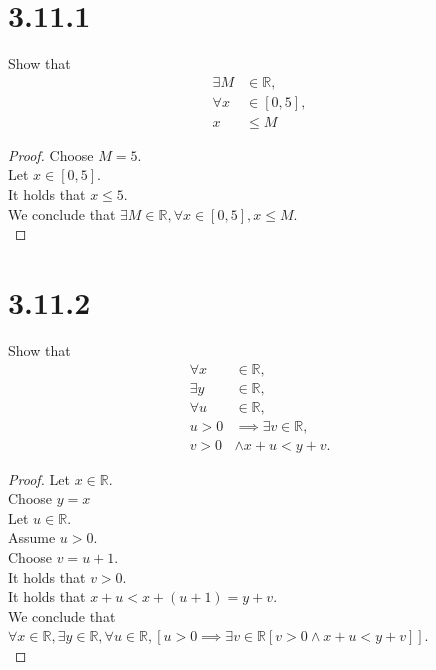 \documentclass{article}
\theoremstyle{mytheoremstyle}
\theoremstyle{mytheoremstyle}
\theoremstyle{myproblemstyle}
\begin{document}
    \newpage

    \section{3.11.1}
    \begin{problem}
        Show that 
        \begin{align*}
            \exists M &\in \mathbb{R}, \\
            \forall x &\in [0,5], \\
            x &\leq M
        \end{align*}
    \end{problem}

    \begin{proof}
        Choose $M = 5$. \\
        Let $x \in [0,5]$. \\
        It holds that $x \leq 5$. \\
        We conclude that $\exists M \in \mathbb{R}, \forall x \in [0,5], x \leq M$. \\
    \end{proof}

    \section{3.11.2}
    \begin{problem}
        Show that 
        \begin{align*}
            \forall x &\in \mathbb{R}, \\
            \exists y &\in \mathbb{R}, \\
            \forall u &\in \mathbb{R}, \\
            u > 0 &\implies \exists v \in \mathbb{R}, \\
            v > 0 &\land x + u < y + v.
        \end{align*}
    \end{problem}

    \begin{proof}
        Let $x \in \mathbb{R}$. \\
        Choose $y = x$ \\
        Let $u \in \mathbb{R}$. \\
        Assume $u > 0$. \\
        Choose $v = u + 1$. \\
        It holds that $v > 0$. \\
        It holds that $x + u < x + (u + 1) = y + v$. \\
        We conclude that $\forall x \in \mathbb{R}, \exists y \in \mathbb{R}, \forall u \in \mathbb{R}, [u > 0 \implies \exists v \in \mathbb{R} [v > 0 \land x + u < y + v]]$. \\
    \end{proof}
\end{document}
